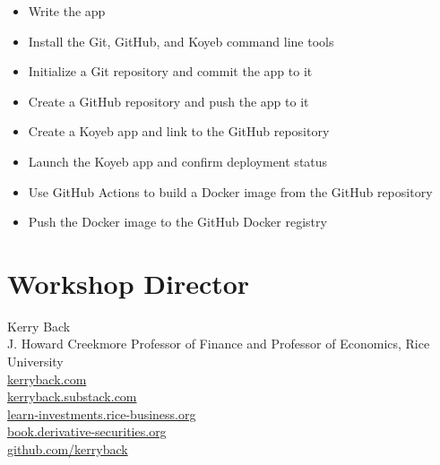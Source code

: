 \documentclass[11pt]{scrartcl}
\begin{document}
\begin{itemize}
\item Write the app
\item Install the Git, GitHub, and Koyeb command line tools
\item Initialize a Git repository and commit the app to it
\item Create a GitHub repository and push the app to it 
\item Create a Koyeb app and link to the GitHub repository
\item Launch the Koyeb app and confirm deployment status
\item Use GitHub Actions to build a Docker image from the GitHub repository
\item Push the Docker image to the GitHub Docker registry
\end{itemize}

\section*{Workshop Director}

Kerry Back \\
J. Howard Creekmore Professor of Finance and Professor of Economics, Rice University \\
\href{https://kerryback.com}{kerryback.com} \\
\href{https://kerryback.substack.com}{kerryback.substack.com} \\
\href{https://learn-investments.rice-business.org}{learn-investments.rice-business.org} \\
\href{https://book.derivative-securities.org}{book.derivative-securities.org} \\
\href{https://github.com/kerryback}{github.com/kerryback}
\end{document}
